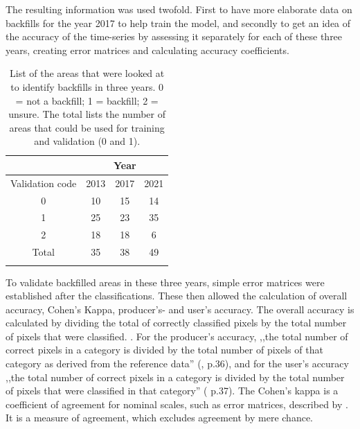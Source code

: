 \documentclass[11pt, A4, oneside]{report}
\begin{document}
The resulting information was used twofold. First to have more elaborate data on backfills for the year 2017 to help train the model, and secondly to get an idea of the accuracy of the time-series by assessing it separately for each of these three years, creating error matrices and calculating accuracy coefficients.

\begin{table}[H]
    \centering
     \caption{List of the areas that were looked at to identify backfills in three years. 0 = not a backfill; 1 = backfill; 2 = unsure. The total lists the number of areas that could be used for training and validation (0 and 1).}
    \label{tab:backfill_Bruno}
    \begin{tabular}{cccc}
    & \multicolumn{3}{c}{Year}\\
        \hline
       Validation code & 2013 & 2017 & 2021\\
        \hline
        0 &  10 & 15 & 14\\
        1 & 25 & 23 & 35\\
        2 & 18 & 18 & 6\\
        \hline
        Total & 35 & 38 & 49\\
        \hline\\
    \end{tabular}
\end{table}

To validate backfilled areas in these three years, simple error matrices were established after the classifications. These then allowed the calculation of overall accuracy, Cohen's Kappa, producer's- and user's accuracy. The overall accuracy is calculated by dividing the total of correctly classified pixels by the total number of pixels that were classified.  \parencite{Congalton.1991}. For the producer's accuracy,  ,,the total number of correct pixels in a category is divided by the total number of pixels of that category as derived from the reference data'' (\cite{Congalton.1991}, p.36), and for the user's accuracy ,,the total number of correct pixels in a category is divided by the total number of pixels that were classified in that category'' (\cite{Congalton.1991} p.37). The Cohen's kappa is a coefficient of agreement for nominal scales, such as error matrices, described by \citet{Cohen.1960}. It is a measure of agreement, which excludes agreement by mere chance.

\newpage
\end{document}
